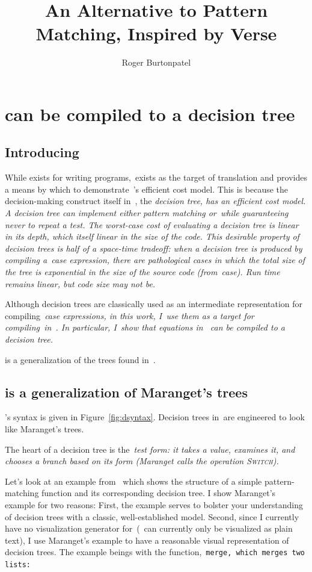 \documentclass[manuscript,screen, 12pt, nonacm]{acmart}
\title{An Alternative to Pattern Matching, Inspired by Verse}
\author{Roger Burtonpatel}
\affiliation{%
\institution{Tufts University}
\streetaddress{419 Boston Ave}
  \city{Medford}
  \state{Massachusetts}
  \country{USA}
  \postcode{02155}
  }
\begin{document}
  

\section{\VMinus can be compiled to a decision tree}
\label{vminustod}

\subsection{Introducing~\D}
\label{d}

While \VMinus exists for writing programs,~\D exists as the target of
translation and provides a means by which to demonstrate~\VMinus's efficient
cost model. This is because the decision-making construct itself in~\D, the
\it{decision tree}, has an efficient cost model. A decision tree can implement
either pattern matching or~\iffibf while guaranteeing never to repeat a test.
The worst-case cost of evaluating a decision tree is linear in its depth, which
itself linear in the size of the code. This desirable property of decision trees
is half of a space-time tradeoff: when a decision tree is produced by compiling
a~\it{case} expression, there are pathological cases in which the total size of
the tree is exponential in the size of the source code (from~\it{case}). Run
time remains linear, but code size may not be. 

Although decision trees are classically used as an intermediate representation
for compiling~\it{case} expressions, in this work, I~use them as a target for
compiling~\iffibf in~\VMinus. In particular, I~show that equations in~\VMinus
can be compiled to a decision tree. 

\D is a generalization of the trees found in~\citet{maranget}. 

\subsection{\D is a generalization of Maranget's trees} 

\D's syntax is given in Figure~\ref{fig:dsyntax}. Decision trees in~\D are
engineered to look like Maranget's trees. 
  
      
  The heart of a decision tree is the~\it{test} form: it takes a value, examines
  it, and chooses a branch based on its form (Maranget calls the operation
  \textsc{Switch}). 

  Let's look at an example from~\citet{maranget} which shows the structure of a
  simple pattern-matching function and its corresponding decision tree. I show
  Maranget's example for two reasons: First, the example serves to bolster your
  understanding of decision trees with a classic, well-established model.
  Second, since I currently have no visualization generator for~\D (\D~can
  currently only be visualized as plain text), I use Maranget's example to have
  a reasonable visual representation of decision trees. The example beings with
  the function,~\tt{merge}, which merges two lists: 
\end{document}
